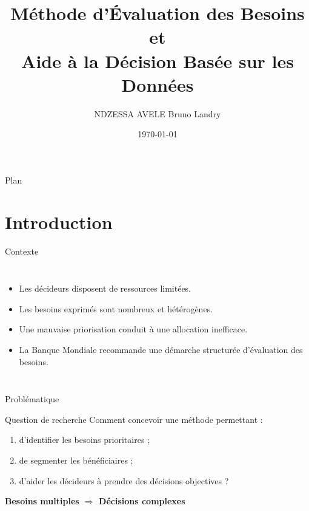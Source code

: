 \documentclass[aspectratio=169]{beamer}
\title{
	Méthode d'Évaluation des Besoins et\\
	Aide à la Décision Basée sur les Données
}
\author{
	NDZESSA AVELE Bruno Landry
}
\institute{
	École Nationale Supérieure Polytechnique de Maroua
}
\date{\today}
\begin{document}
	
	\begin{frame}
		\titlepage
	\end{frame}
	
	\begin{frame}{Plan}
		\tableofcontents
	\end{frame}

\section{Introduction}

\begin{frame}{Contexte}
	
	\begin{columns}
		
		\column{0.55\textwidth}
		
		\begin{itemize}
			\item Les décideurs disposent de ressources limitées.
			\item Les besoins exprimés sont nombreux et hétérogènes.
			\item Une mauvaise priorisation conduit à une allocation inefficace.
			\item La Banque Mondiale recommande une démarche structurée d'évaluation des besoins.
		\end{itemize}
		
		\column{0.45\textwidth}
		
		
	\end{columns}
	
\end{frame}

\begin{frame}{Problématique}
	
	\begin{block}{Question de recherche}
		Comment concevoir une méthode permettant :
		
		\begin{enumerate}
			\item d'identifier les besoins prioritaires ;
			\item de segmenter les bénéficiaires ;
			\item d'aider les décideurs à prendre des décisions objectives ?
		\end{enumerate}
		
	\end{block}
	
	\vspace{0.4cm}
	
	\centering
	\Large
	\textbf{Besoins multiples $\Rightarrow$ Décisions complexes}
	
\end{frame}
\end{document}

